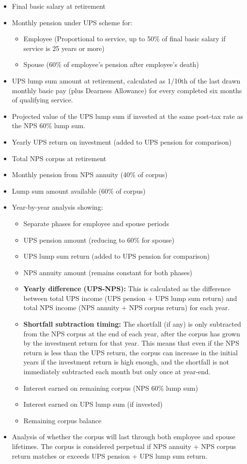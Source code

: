 \documentclass{article}
\begin{document}
\begin{itemize}
    \item Final basic salary at retirement
    \item Monthly pension under UPS scheme for:
    \begin{itemize}
        \item Employee (Proportional to service, up to 50\% of final basic salary if service is 25 years or more)
        \item Spouse (60\% of employee's pension after employee's death)
    \end{itemize}
    \item UPS lump sum amount at retirement, calculated as 1/10th of the last drawn monthly basic pay (plus Dearness Allowance) for every completed six months of qualifying service.
    \item Projected value of the UPS lump sum if invested at the same post-tax rate as the NPS 60\% lump sum.
    \item Yearly UPS return on investment (added to UPS pension for comparison)
    \item Total NPS corpus at retirement
    \item Monthly pension from NPS annuity (40\% of corpus)
    \item Lump sum amount available (60\% of corpus)
    \item Year-by-year analysis showing:
    \begin{itemize}
        \item Separate phases for employee and spouse periods
        \item UPS pension amount (reducing to 60\% for spouse)
        \item UPS lump sum return (added to UPS pension for comparison)
        \item NPS annuity amount (remains constant for both phases)
        \item \textbf{Yearly difference (UPS-NPS):} This is calculated as the difference between total UPS income (UPS pension + UPS lump sum return) and total NPS income (NPS annuity + NPS corpus return) for each year.
        \item \textbf{Shortfall subtraction timing:} The shortfall (if any) is only subtracted from the NPS corpus at the end of each year, after the corpus has grown by the investment return for that year. This means that even if the NPS return is less than the UPS return, the corpus can increase in the initial years if the investment return is high enough, and the shortfall is not immediately subtracted each month but only once at year-end.
        \item Interest earned on remaining corpus (NPS 60\% lump sum)
        \item Interest earned on UPS lump sum (if invested)
        \item Remaining corpus balance
    \end{itemize}
    \item Analysis of whether the corpus will last through both employee and spouse lifetimes. The corpus is considered perpetual if NPS annuity + NPS corpus return matches or exceeds UPS pension + UPS lump sum return.
\end{itemize}
\end{document}
